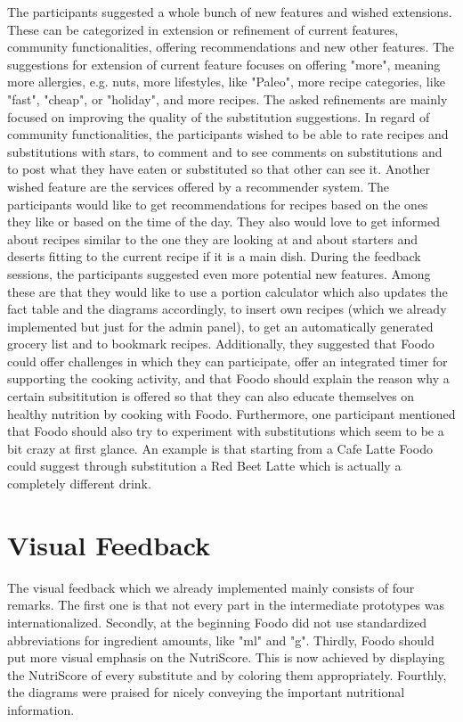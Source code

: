 The participants suggested a whole bunch of new features and wished extensions. These can be categorized in extension or refinement of current features, community functionalities, offering recommendations and new other features. The suggestions for extension of current feature focuses on offering "more", meaning more allergies, e.g. nuts, more lifestyles, like "Paleo", more recipe categories, like "fast", "cheap", or "holiday", and more recipes. The asked refinements are mainly focused on improving the quality of the substitution suggestions. In regard of community functionalities, the participants wished to be able to rate recipes and substitutions with stars, to comment and to see comments on substitutions and to post what they have eaten or substituted so that other can see it. Another wished feature are the services offered by a recommender system. The participants would like to get recommendations for recipes based on the ones they like or based on the time of the day. They also would love to get informed about recipes similar to the one they are looking at and about starters and deserts fitting to the current recipe if it is a main dish. During the feedback sessions, the participants suggested even more potential new features. Among these are that they would like to use a portion calculator which also updates the fact table and the diagrams accordingly, to insert own recipes (which we already implemented but just for the admin panel), to get an automatically generated grocery list and to bookmark recipes. Additionally, they suggested that Foodo could offer challenges in which they can participate, offer an integrated timer for supporting the cooking activity, and that Foodo should explain the reason why a certain subsititution is offered so that they can also educate themselves on healthy nutrition by cooking with Foodo. Furthermore, one participant mentioned that Foodo should also try to experiment with substitutions which seem to be a bit crazy at first glance. An example is that starting from a Cafe Latte Foodo could suggest through substitution a Red Beet Latte which is actually a completely different drink.
    
\section{Visual Feedback}


The visual feedback which we already implemented mainly consists of four remarks. The first one is that not every part in the intermediate prototypes was internationalized. Secondly, at the beginning Foodo did not use standardized abbreviations for ingredient amounts, like "ml" and "g". Thirdly, Foodo should put more visual emphasis on the NutriScore. This is now achieved by displaying the NutriScore of every substitute and by coloring them appropriately. Fourthly, the diagrams were praised for nicely conveying the important nutritional information. 

